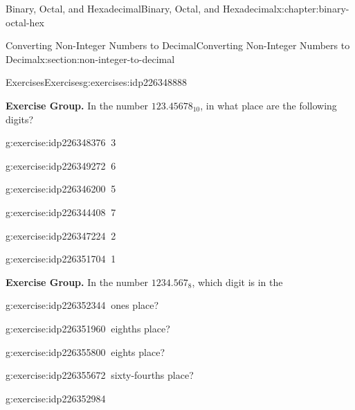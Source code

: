 \documentclass[twoside,10pt,]{book}
\numberwithin{equation}{section}
\begin{document}
\begin{chapterptx}{Binary, Octal, and Hexadecimal}{}{Binary, Octal, and Hexadecimal}{}{}{x:chapter:binary-octal-hex}
\begin{sectionptx}{Converting Non-Integer Numbers to Decimal}{}{Converting Non-Integer Numbers to Decimal}{}{}{x:section:non-integer-to-decimal}
\typeout{************************************************}
%
\begin{exercises-subsection}{Exercises}{}{Exercises}{}{}{g:exercises:idp226348888}
\par\medskip\noindent%
\textbf{Exercise Group.}\space\space%
In the number \(123.45678_{10}\), in what place are the following digits?\begin{exercisegroup}
\begin{divisionexerciseeg}{1}{}{}{g:exercise:idp226348376}%
\(\ \)3\end{divisionexerciseeg}%
\begin{divisionexerciseeg}{2}{}{}{g:exercise:idp226349272}%
\(\ \)6\end{divisionexerciseeg}%
\begin{divisionexerciseeg}{3}{}{}{g:exercise:idp226346200}%
\(\ \)5\end{divisionexerciseeg}%
\begin{divisionexerciseeg}{4}{}{}{g:exercise:idp226344408}%
\(\ \)7\end{divisionexerciseeg}%
\begin{divisionexerciseeg}{5}{}{}{g:exercise:idp226347224}%
\(\ \)2\end{divisionexerciseeg}%
\begin{divisionexerciseeg}{6}{}{}{g:exercise:idp226351704}%
\(\ \)1\end{divisionexerciseeg}%
\end{exercisegroup}
\par\medskip\noindent
\par\medskip\noindent%
\textbf{Exercise Group.}\space\space%
In the number \(1234.567_8\), which digit is in the\begin{exercisegroup}
\begin{divisionexerciseeg}{7}{}{}{g:exercise:idp226352344}%
\(\ \)ones place?\end{divisionexerciseeg}%
\begin{divisionexerciseeg}{8}{}{}{g:exercise:idp226351960}%
\(\ \)eighths place?\end{divisionexerciseeg}%
\begin{divisionexerciseeg}{9}{}{}{g:exercise:idp226355800}%
\(\ \)eights place?\end{divisionexerciseeg}%
\begin{divisionexerciseeg}{10}{}{}{g:exercise:idp226355672}%
\(\ \)sixty-fourths place?\end{divisionexerciseeg}%
\begin{divisionexerciseeg}{11}{}{}{g:exercise:idp226352984}%

\end{divisionexerciseeg}
\end{exercisegroup}
\end{exercises-subsection}
\end{sectionptx}
\end{chapterptx}
\end{document}
